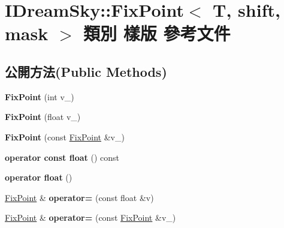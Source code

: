 \hypertarget{class_i_dream_sky_1_1_fix_point}{}\section{I\+Dream\+Sky\+:\+:Fix\+Point$<$ T, shift, mask $>$ 類別 樣版 參考文件}
\label{class_i_dream_sky_1_1_fix_point}
\subsection*{公開方法(Public Methods)}
\begin{DoxyCompactItemize}
\item 
{\bfseries Fix\+Point} (int v\+\_\+)\hypertarget{class_i_dream_sky_1_1_fix_point_a6c7fbfb96abb71e2ee63a052522c72c2}{}\label{class_i_dream_sky_1_1_fix_point_a6c7fbfb96abb71e2ee63a052522c72c2}

\item 
{\bfseries Fix\+Point} (float v\+\_\+)\hypertarget{class_i_dream_sky_1_1_fix_point_a3fd30dc58e328ca244241a7342af156f}{}\label{class_i_dream_sky_1_1_fix_point_a3fd30dc58e328ca244241a7342af156f}

\item 
{\bfseries Fix\+Point} (const \hyperlink{class_i_dream_sky_1_1_fix_point}{Fix\+Point} \&v\+\_\+)\hypertarget{class_i_dream_sky_1_1_fix_point_a66b8b6abb3694b82ec39b7db89d27fb1}{}\label{class_i_dream_sky_1_1_fix_point_a66b8b6abb3694b82ec39b7db89d27fb1}

\item 
{\bfseries operator const float} () const \hypertarget{class_i_dream_sky_1_1_fix_point_aabc7508b6cde0f4c915c4ddfc32683ed}{}\label{class_i_dream_sky_1_1_fix_point_aabc7508b6cde0f4c915c4ddfc32683ed}

\item 
{\bfseries operator float} ()\hypertarget{class_i_dream_sky_1_1_fix_point_a43f5e95c5fb688ad81b2393c89957497}{}\label{class_i_dream_sky_1_1_fix_point_a43f5e95c5fb688ad81b2393c89957497}

\item 
\hyperlink{class_i_dream_sky_1_1_fix_point}{Fix\+Point} \& {\bfseries operator=} (const float \&v)\hypertarget{class_i_dream_sky_1_1_fix_point_a71244bbdbeb870be1f75d846bb0cfa85}{}\label{class_i_dream_sky_1_1_fix_point_a71244bbdbeb870be1f75d846bb0cfa85}

\item 
\hyperlink{class_i_dream_sky_1_1_fix_point}{Fix\+Point} \& {\bfseries operator=} (const \hyperlink{class_i_dream_sky_1_1_fix_point}{Fix\+Point} \&v\+\_\+)\hypertarget{class_i_dream_sky_1_1_fix_point_a570ce5c729c618679a3aca8eaa58317e}{}\label{class_i_dream_sky_1_1_fix_point_a570ce5c729c618679a3aca8eaa58317e}


\end{DoxyCompactItemize}
